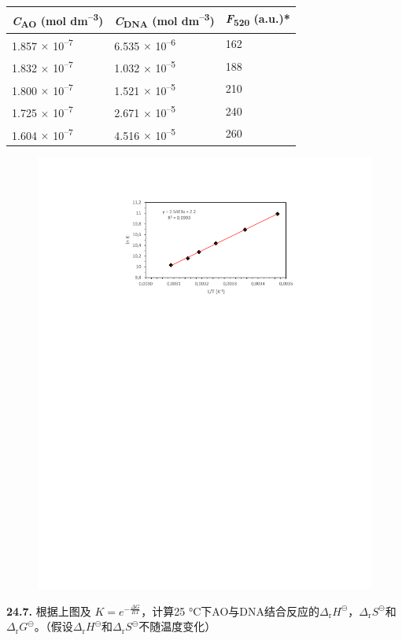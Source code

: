 \newpage
\begin{longtable}[]{@{}lll@{}}
    \toprule
    \emph{C}\textsubscript{AO} (mol dm\textsuperscript{--3}) &
    \emph{C}\textsubscript{DNA} (mol dm\textsuperscript{--3}) &
    \emph{F}\textsubscript{520} (a.u.)*\tabularnewline
    \midrule
    \endhead
    1.857 \(\times\) 10\textsuperscript{--7} & 6.535 \(\times\) 10\textsuperscript{--6} &
    162\tabularnewline
    1.832 \(\times\) 10\textsuperscript{--7} & 1.032 \(\times\) 10\textsuperscript{--5} &
    188\tabularnewline
    1.800 \(\times\) 10\textsuperscript{--7} & 1.521 \(\times\) 10\textsuperscript{--5} &
    210\tabularnewline
    1.725 \(\times\) 10\textsuperscript{--7} & 2.671 \(\times\) 10\textsuperscript{--5} &
    240\tabularnewline
    1.604 \(\times\) 10\textsuperscript{--7} & 4.516 \(\times\) 10\textsuperscript{--5} &
    260\tabularnewline
    \bottomrule
\end{longtable}

\begin{figure}[h]
	\centering
	\includegraphics[width=12cm]{./pic/t24-1.pdf}
\end{figure}

\noindent\textbf{24.7.}
根据上图及 $K=e^{-\frac{\Delta  G}{RT}}$，计算25 °C下AO与DNA结合反应的$\Delta\mathrm{  _r}H^\ominus$，$\Delta \mathrm{_r}S^\ominus$和$\Delta \mathrm{  _r}G^\ominus$。（假设$\Delta \mathrm{  _r}H^\ominus$和$\Delta \mathrm{  _r}S^\ominus$不随温度变化）

